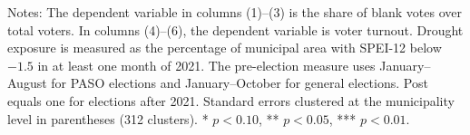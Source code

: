 \begin{table}[!htbp]
\vspace{0.2cm}
\begin{minipage}{0.98\textwidth}
\footnotesize Notes: The dependent variable in columns (1)--(3) is the share of blank votes over total voters. In columns (4)--(6), the dependent variable is voter turnout. Drought exposure is measured as the percentage of municipal area with SPEI-12 below $-1.5$ in at least one month of 2021. The pre-election measure uses January--August for PASO elections and January--October for general elections. Post equals one for elections after 2021. Standard errors clustered at the municipality level in parentheses (312 clusters). * $p<0.10$, ** $p<0.05$, *** $p<0.01$.
\end{minipage}
\end{table}
